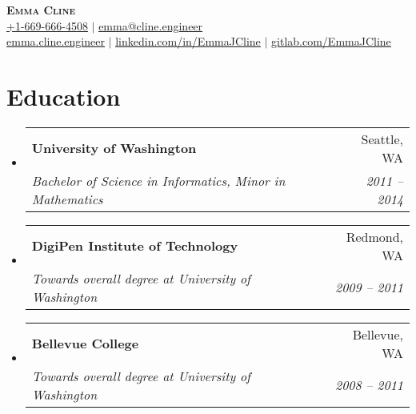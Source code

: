 \documentclass[letterpaper,11pt]{article}
\makeatletter
\newcommand{\resumeSubheading}[4]{
  \vspace{-2pt}\item
    \begin{tabular*}{0.97\textwidth}[t]{l@{\extracolsep{\fill}}r}
      \textbf{#1} & #2 \\
      \textit{\small#3} & \textit{\small #4} \\
    \end{tabular*}\vspace{-7pt}
}
\newcommand{\resumeSubHeadingListStart}{\begin{itemize}[leftmargin=0.15in, label={}]}
\newcommand{\resumeSubHeadingListEnd}{\end{itemize}}
\makeatother
\begin{document}
\begin{center}
    \textbf{\Huge \scshape Emma Cline} \\ \vspace{1pt}
    \href{tel:+1-669-666-4508}{\underline{+1-669-666-4508}} $|$
    \href{mailto:emma@cline.engineer}{\underline{emma@cline.engineer}} \\ \vspace{1pt}
    \href{https://emma.cline.engineer}{\underline{emma.cline.engineer}} $|$
    \href{https://www.linkedin.com/in/EmmaJCline}{\underline{linkedin.com/in/EmmaJCline}} $|$
    \href{https://gitlab.com/EmmaJCline}{\underline{gitlab.com/EmmaJCline}}
\end{center}
\section{Education}
  \resumeSubHeadingListStart
    \resumeSubheading
      {University of Washington}{Seattle, WA}
      {Bachelor of Science in Informatics, Minor in Mathematics}{2011 -- 2014}
    \resumeSubheading
      {DigiPen Institute of Technology}{Redmond, WA}
      {Towards overall degree at University of Washington}{2009 -- 2011}
    \resumeSubheading
      {Bellevue College}{Bellevue, WA}
      {Towards overall degree at University of Washington}{2008 -- 2011}
  \resumeSubHeadingListEnd
\end{document}
